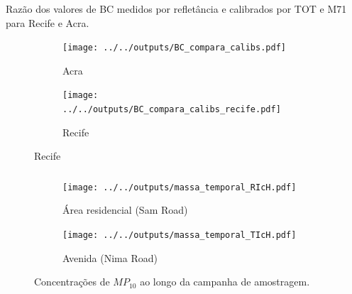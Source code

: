 \begin{frame}
  \frametitle{}
  Razão dos valores de BC medidos por refletância e calibrados por 
  TOT e M71 para Recife e Acra.
  \begin{figure}[H]
  	\centering
  	\begin{subfigure}[b]{0.43\linewidth}
  		\texttt{[image: ../../outputs/BC\_compara\_calibs.pdf]}
  		\caption{Acra \label{fig:razaoTOTM71}}
  	\end{subfigure}
  		\hspace{0.3cm}
  	\begin{subfigure}[b]{0.43\linewidth}
  		\texttt{[image: ../../outputs/BC\_compara\_calibs\_recife.pdf]}
  		\caption{Recife \label{fig:BC_compara_recife}}
  	\end{subfigure}%
   \end{figure}
\end{frame}

\begin{frame}
  \frametitle{}
  \begin{table}[H]
  \centering
  \tiny 
    
  \end{table}
  
  \begin{table}[H]
  \centering
  \tiny 
    
  \end{table}
    \begin{table}[H]
      \centering
      \tiny 
      

    \end{table}
\end{frame}


\begin{frame}
  \frametitle{}
  \begin{figure}[H]
    \centering
    \begin{subfigure}[b]{0.45\textwidth}
      \texttt{[image: ../../outputs/massa\_temporal\_RIcH.pdf]}
      \caption{Área residencial (Sam Road)}
    \end{subfigure}%
    \begin{subfigure}[b]{0.45\textwidth}
      \texttt{[image: ../../outputs/massa\_temporal\_TIcH.pdf]}
      \caption{Avenida (Nima Road)}
    \end{subfigure}
    \caption{Concentrações de $MP_{10}$ ao longo da campanha de amostragem.
             \label{fig:massa_temporal_mp10}}
  \end{figure}
\end{frame}

